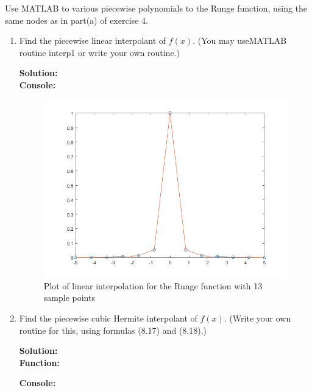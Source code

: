\documentclass[12pt]{article}
\makeatletter
\theoremstyle{homework}
\newenvironment{exercise}[1]
{\def\@currentlabel{#1}\exercisecore}
{\endexercisecore}
\newcommand{\localhead}[1]{\par\smallskip\noindent\textbf{#1}\nobreak\\}%
\newcommand\solution{\localhead{Solution:}}
\makeatother
\begin{document}
\begin{exercise}{Text 8.7 (a,b)} Use MATLAB to  various piecewise polynomials to  the  Runge function, using the same nodes as in part(a) of exercise 4.\\
  \begin{enumerate}
    \item Find the piecewise linear interpolant of $f(x)$.  (You  may useMATLAB routine interp1 or write your own routine.)\\
    \solution 
    \textbf{Console:}
    \begin{center}
    
    \end{center}
    \begin{figure}[H]
      \caption{Plot of linear interpolation for the Runge function with 13 sample points}
      \includegraphics[width = \textwidth]{linear_interRunge.png}  
      \centering
   \end{figure}
   \vspace{.25in}

   \item Find the piecewise cubic Hermite interpolant of $f(x)$. (Write your own routine for this, using formulas (8.17) and (8.18).)\\
   \solution

   
   \textbf{Function:}
   \begin{center}
   
   \end{center}
   
   
   
   \textbf{Console:}
    \begin{center}
    
    \end{center}
  

\end{enumerate}
\end{exercise}
\end{document}
